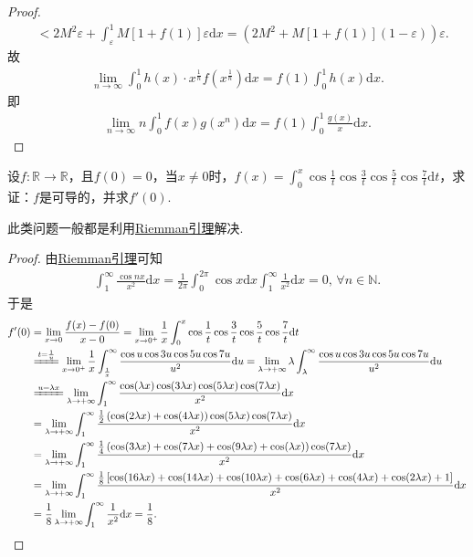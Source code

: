 \documentclass[../../main.tex]{subfiles}
\begin{document}
\begin{proof}
\begin{align*}
&<2M^2\varepsilon+\int_{\varepsilon}^1 M\left[1+f(1)\right]\varepsilon\mathrm{d}x=\left(2M^2+M\left[1+f(1)\right]\left(1-\varepsilon\right)\right)\varepsilon.
\end{align*}
故
\begin{align*}
\lim\limits_{n\rightarrow \infty}\int_0^1 h(x)\cdot x^{\frac{1}{n}}f\left(x^{\frac{1}{n}}\right)\mathrm{d}x=f(1)\int_0^1 h(x)\mathrm{d}x.
\end{align*}
即
\begin{align*}
\lim_{n\rightarrow \infty}n\int_0^1 f(x)g(x^n)\mathrm{d}x=f(1)\int_0^1 \frac{g(x)}{x}\mathrm{d}x.
\end{align*}
\end{proof}

\begin{example}
设$f:\mathbb{R}\to\mathbb{R}$，且$f(0)=0$，当$x\neq0$时，$f(x)=\int_0^x\cos\frac{1}{t}\cos\frac{3}{t}\cos\frac{5}{t}\cos\frac{7}{t}\mathrm{d}t$，求证：$f$是可导的，并求$f'(0)$.
\end{example}
\begin{note}
此类问题一般都是利用\hyperref[lemma:Riemann引理]{Riemman引理}解决.
\end{note}
\begin{proof}
由\hyperref[lemma:Riemann引理]{Riemman引理}可知
\begin{align*}
\int_1^{\infty} \frac{\cos nx}{x^2} \mathrm{d}x = \frac{1}{2\pi} \int_0^{2\pi} \cos x \mathrm{d}x \int_1^{\infty} \frac{1}{x^2} \mathrm{d}x = 0, \, \forall n \in \mathbb{N}.
\end{align*}
于是
\begin{align*}
f'(0) &= \lim_{x \to 0} \frac{f(x) - f(0)}{x - 0} = \lim_{x \to 0^+} \frac{1}{x} \int_0^x \cos \frac{1}{t} \cos \frac{3}{t} \cos \frac{5}{t} \cos \frac{7}{t} \mathrm{d}t \\
&\xlongequal{t = \frac{1}{u}} \lim_{x \to 0^+} \frac{1}{x} \int_{\frac{1}{x}}^{\infty} \frac{\cos u \cos 3u \cos 5u \cos 7u}{u^2} \mathrm{d}u = \lim_{\lambda \to +\infty} \lambda \int_{\lambda}^{\infty} \frac{\cos u \cos 3u \cos 5u \cos 7u}{u^2} \mathrm{d}u \\
&\xlongequal{u = \lambda x} \lim_{\lambda \to +\infty} \int_1^{\infty} \frac{\cos(\lambda x) \cos(3\lambda x) \cos(5\lambda x) \cos(7\lambda x)}{x^2} \mathrm{d}x \\
&= \lim_{\lambda \to +\infty} \int_1^{\infty} \frac{\frac{1}{2} \left( \cos(2\lambda x) + \cos(4\lambda x) \right) \cos(5\lambda x) \cos(7\lambda x)}{x^2} \mathrm{d}x \\
&= \lim_{\lambda \to +\infty} \int_1^{\infty} \frac{\frac{1}{4} \left( \cos(3\lambda x) + \cos(7\lambda x) + \cos(9\lambda x) + \cos(\lambda x) \right) \cos(7\lambda x)}{x^2} \mathrm{d}x \\
&= \lim_{\lambda \to +\infty} \int_1^{\infty} \frac{\frac{1}{8} \left[ \cos(16\lambda x) + \cos(14\lambda x) + \cos(10\lambda x) + \cos(6\lambda x) + \cos(4\lambda x) + \cos(2\lambda x) + 1 \right]}{x^2} \mathrm{d}x \\
&= \frac{1}{8} \lim_{\lambda \to +\infty} \int_1^{\infty} \frac{1}{x^2} \mathrm{d}x = \frac{1}{8}.
\end{align*}
\end{proof}
\end{document}
